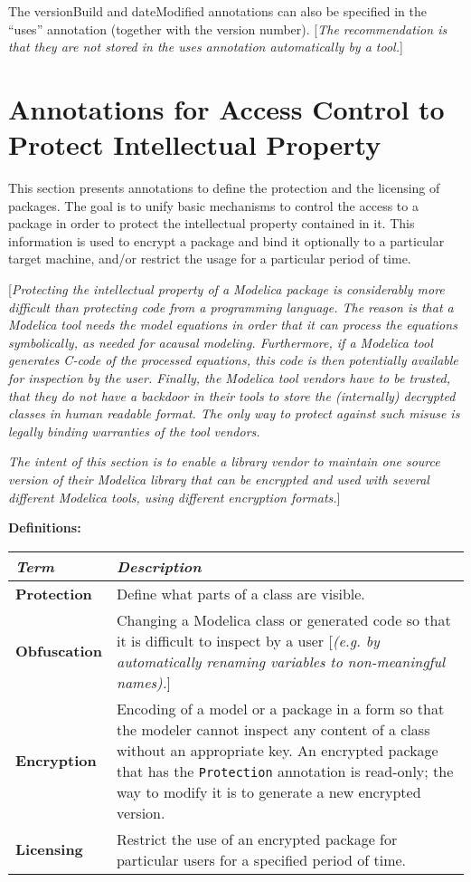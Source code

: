 The versionBuild and dateModified annotations can also be specified in
the ``uses'' annotation (together with the version number). {[}\emph{The
recommendation is that they are not stored in the uses annotation
automatically by a tool.}{]}

\section{Annotations for Access Control to Protect Intellectual Property}

This section presents annotations to define the protection and the
licensing of packages. The goal is to unify basic mechanisms to control
the access to a package in order to protect the intellectual property
contained in it. This information is used to encrypt a package and bind
it optionally to a particular target machine, and/or restrict the usage
for a particular period of time.

{[}\emph{Protecting the intellectual property of a Modelica package is
considerably more difficult than protecting code from a programming
language. The reason is that a Modelica tool needs the model equations
in order that it can process the equations symbolically, as needed for
acausal modeling. Furthermore, if a Modelica tool generates C-code of
the processed equations, this code is then potentially available for
inspection by the user. Finally, the Modelica tool vendors have to be
trusted, that they do not have a backdoor in their tools to store the
(internally) decrypted classes in human readable format. The only way to
protect against such misuse is legally binding warranties of the tool
vendors. }

\emph{The intent of this section is to enable a library vendor to
maintain one source version of their Modelica library that can be
encrypted and used with several different Modelica tools, using
different encryption formats.}{]}

\textbf{Definitions:}

\begin{longtable}[]{|p{2.5cm}|p{12cm}|}
\hline
\emph{Term} & \emph{Description}\\ \hline
\endhead
\textbf{Protection} & Define what parts of a class are
visible.\\ \hline
\textbf{Obfuscation} & Changing a Modelica class or generated code so
that it is difficult to inspect by a user {[}\emph{(e.g. by
automatically renaming variables to non-meaningful
names).}{]}\\ \hline
\textbf{Encryption} & Encoding of a model or a package in a form so that
the modeler cannot inspect any content of a class without an appropriate
key. An encrypted package that has the \lstinline!Protection! annotation is
read-only; the way to modify it is to generate a new encrypted
version.\\ \hline
\textbf{Licensing} & Restrict the use of an encrypted package for
particular users for a specified period of time.\\ \hline

\end{longtable}

